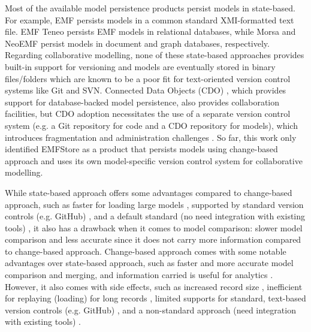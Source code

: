 \documentclass[sigplan,review,anonymous]{acmart}\settopmatter{printfolios=true,printccs=false,printacmref=false}
\begin{document}
Most of the available model persistence products persist models in state-based. For example, EMF persists models in a common standard XMI-formatted text file. EMF Teneo \cite{eclipse2017teneo} persists EMF models in relational databases, while Morsa \cite{DBLP:conf/models/Espinazo-PaganCM11} and NeoEMF \cite{daniel2016neoemf} persist models in document and graph databases, respectively. Regarding collaborative modelling, none of these state-based approaches provides built-in support for versioning and models are eventually stored in binary files/folders which are known to be a poor fit for text-oriented version control systems like Git and SVN. Connected Data Objects (CDO) \cite{eclipse2017cdo}, which provides support for database-backed model persistence, also provides collaboration facilities, but CDO adoption necessitates the use of a separate version control system (e.g. a Git repository for code and a CDO repository for models), which introduces fragmentation and administration challenges \cite{barmpis2014evaluation}. So far, this work only identified EMFStore \cite{koegel2010emfstore} as a product that persists models using change-based approach and uses its own model-specific version control system for collaborative modelling.

While state-based approach offers some advantages compared to change-based approach, such as faster for loading large models \cite{DBLP:conf/models/Espinazo-PaganCM11,daniel2016neoemf}, supported by standard version controls (e.g. GitHub) \cite{koegel2010emfstore}, and a default standard (no need integration with existing tools) \cite{koegel2010emfstore}, it also has a drawback when it comes to model comparison: slower model comparison \cite{DBLP:conf/edoc/KoegelHLHD10} and less accurate since it does not carry more information \cite{mens2002state,DBLP:conf/edoc/KoegelHLHD10} compared to change-based approach. Change-based approach comes with some notable advantages over state-based approach, such as faster \cite{DBLP:conf/sde/LippeO92,DBLP:conf/caise/IgnatN05,DBLP:conf/edoc/KoegelHLHD10} and more accurate \cite{DBLP:journals/entcs/RobbesL07,DBLP:conf/sde/LippeO92,DBLP:conf/caise/IgnatN05,mens2002state} model comparison and merging, and information carried is useful for analytics \cite{DBLP:journals/entcs/RobbesL07}. However, it also comes with side effects, such as increased record size \cite{DBLP:journals/entcs/RobbesL07,DBLP:conf/edoc/KoegelHLHD10}, inefficient for replaying (loading) for long records \cite{mens2002state}, limited supports for standard, text-based version controls (e.g. GitHub) \cite{koegel2010emfstore}, and a non-standard approach (need integration with existing tools) \cite{koegel2010emfstore}.
\end{document}

